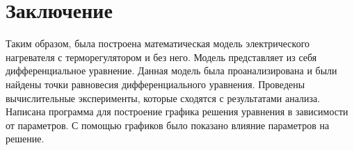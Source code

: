 \section{Заключение}
    Таким образом, была построена математическая модель электрического нагревателя с терморегулятором и без него. Модель представляет из себя дифференциальное уравнение. Данная модель была проанализирована и были найдены точки равновесия дифференциального уравнения. Проведены вычислительные эксперименты, которые сходятся с результатами анализа. Написана программа для построение графика решения уравнения в зависимости от параметров. С помощью графиков было показано влияние параметров на решение.